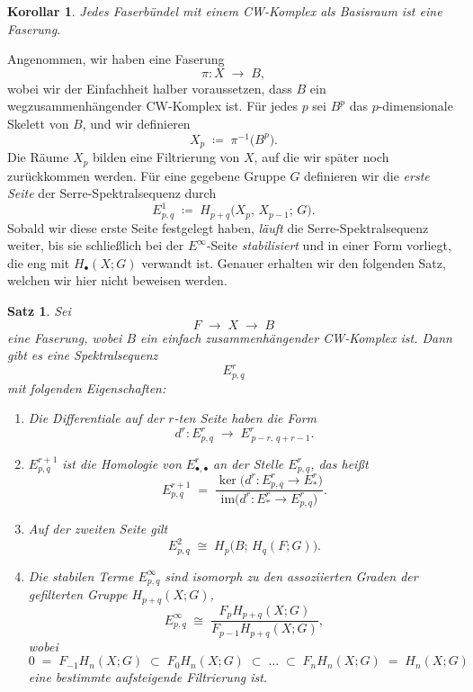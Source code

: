 \documentclass[12pt, hidelinks]{article}
\numberwithin{conj}{section}
\newtheorem{theorem}[conj]{Satz}
\newtheorem{corollary}[conj]{Korollar}
\begin{document}
\begin{corollary}
    Jedes Faserbündel mit einem CW-Komplex als Basisraum ist eine Faserung.
\end{corollary}

\noindent
Angenommen, wir haben eine Faserung 
\[
    \pi: X \;\longrightarrow\; B,
\]
wobei wir der Einfachheit halber voraussetzen, dass $B$ ein wegzusammenhängender CW-Komplex ist. Für jedes $p$ sei $B^p$ das $p$-dimensionale Skelett von $B$, und wir definieren
\[
    X_p \;\coloneqq\; \pi^{-1}\bigl(B^p\bigr).
\]
Die Räume $X_p$ bilden eine Filtrierung von $X$, auf die wir später noch zurückkommen werden. Für eine gegebene Gruppe $G$ definieren wir die \emph{erste Seite} der Serre-Spektralsequenz durch
\[
    E^1_{p,q}
    \;\coloneqq\;
    H_{p+q}\bigl(X_p,\,X_{p-1};\,G\bigr).
\]
Sobald wir diese erste Seite festgelegt haben, \emph{läuft} die Serre-Spektralsequenz weiter, bis sie schließlich bei der $E^\infty$-Seite \emph{stabilisiert} und in einer Form vorliegt, die eng mit $H_{\bullet}(X;G)$ verwandt ist. Genauer erhalten wir den folgenden Satz, welchen wir hier nicht beweisen werden.

\begin{theorem}{\cite[Proposition 4E.1]{hatcher2001}}
\label{thm:SerreSpectralSequence}
Sei 
\[
    F \;\longrightarrow\; X \;\longrightarrow\; B
\]
eine Faserung, wobei $B$ ein einfach zusammenhängender CW-Komplex ist. Dann gibt es eine Spektralsequenz 
\[
    E^r_{p,q}
\]
mit folgenden Eigenschaften:
\begin{enumerate}[label=(\alph*)]
    \item Die Differentiale auf der $r$-ten Seite haben die Form
    \[
        d^r : E^r_{p,q} \;\longrightarrow\; E^r_{\,p-r,\,q+r-1}.
    \]
    \item $E^{r+1}_{p,q}$ ist die Homologie von $E^r_{\bullet,\bullet}$ an der Stelle $E^r_{p,q}$, 
    das heißt
    \[
        E^{r+1}_{p,q}
        \;=\;
        \frac{\ker\bigl(d^r : E^r_{p,q} \to E^r_{\!*}\bigr)}{\mathrm{im}\bigl(d^r : E^r_{\!*} \to E^r_{p,q}\bigr)}.
    \]
    \item Auf der zweiten Seite gilt
    \[
        E^2_{p,q}
        \;\cong\;
        H_{p}\bigl(B;\,H_{q}(F;G)\bigr).
    \]
    \item Die stabilen Terme $E^\infty_{p,q}$ sind isomorph zu den assoziierten Graden der gefilterten Gruppe $H_{p+q}(X;G)$,
    \[
        E^\infty_{p,q}
        \;\cong\;
        \frac{F_pH_{p+q}(X;G)}{F_{p-1}H_{p+q}(X;G)},
    \]
    wobei 
    \[
        0
        \;=\;
        F_{-1}H_{n}(X;G)
        \;\subset\;
        F_0H_{n}(X;G)
        \;\subset\;
        \dots
        \;\subset\;
        F_nH_{n}(X;G)
        \;=\;
        H_{n}(X;G)
    \]
    eine bestimmte aufsteigende Filtrierung ist.
\end{enumerate}
\end{theorem}
\end{document}
